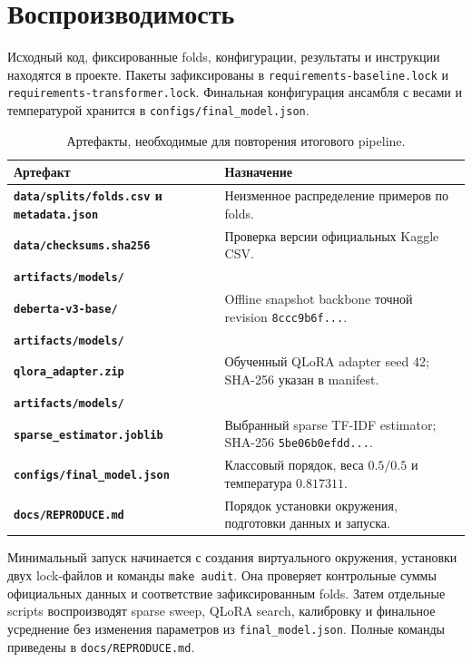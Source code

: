 \documentclass[a4paper,11pt]{article}
\newcommand{\code}[1]{\texttt{#1}}
\begin{document}
\section{Воспроизводимость}

Исходный код, фиксированные folds, конфигурации, результаты и инструкции
находятся в проекте. Пакеты зафиксированы в
\code{requirements-baseline.lock} и \code{requirements-transformer.lock}.
Финальная конфигурация ансамбля с весами и температурой хранится в
\code{configs/final\_model.json}.

\begin{table}[htbp]
\centering
\caption{Артефакты, необходимые для повторения итогового pipeline.}
\label{tab:artifacts}
\small
\begin{tabularx}{\textwidth}{|>{\bfseries}p{}|Y|}
\hline
{} Артефакт & Назначение \\ \hline
\code{data/splits/folds.csv} и \code{metadata.json} & Неизменное распределение примеров по folds. \\ \hline
\code{data/checksums.sha256} & Проверка версии официальных Kaggle CSV. \\ \hline
\code{artifacts/models/}\\\code{deberta-v3-base/} & Offline snapshot backbone точной revision \code{8ccc9b6f...}. \\ \hline
\code{artifacts/models/}\\\code{qlora\_adapter.zip} & Обученный QLoRA adapter seed 42; SHA-256 указан в manifest. \\ \hline
\code{artifacts/models/}\\\code{sparse\_estimator.joblib} & Выбранный sparse TF-IDF estimator; SHA-256 \code{5be06b0efdd...}. \\ \hline
\code{configs/final\_model.json} & Классовый порядок, веса $0.5/0.5$ и температура $0.817311$. \\ \hline
\code{docs/REPRODUCE.md} & Порядок установки окружения, подготовки данных и запуска. \\ \hline
\end{tabularx}
\end{table}

Минимальный запуск начинается с создания виртуального окружения, установки
двух lock-файлов и команды \code{make audit}. Она проверяет контрольные суммы
официальных данных и соответствие зафиксированным folds. Затем отдельные
scripts воспроизводят sparse sweep, QLoRA search, калибровку и финальное
усреднение без изменения параметров из \code{final\_model.json}. Полные
команды приведены в \code{docs/REPRODUCE.md}.
\end{document}
